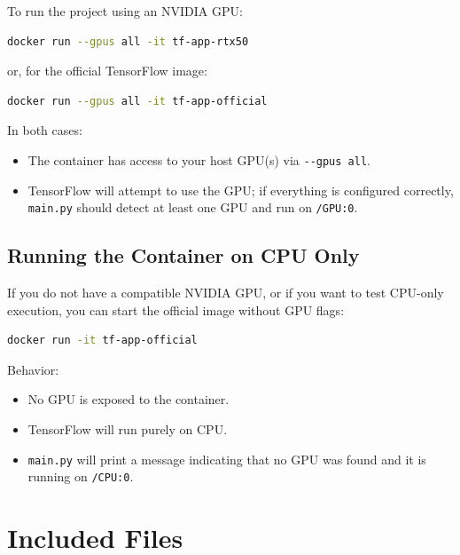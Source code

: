 \documentclass[a4paper,11pt]{article}
\begin{document}
To run the project using an NVIDIA GPU:


\begin{lstlisting}[language=bash]
docker run --gpus all -it tf-app-rtx50
\end{lstlisting}


or, for the official TensorFlow image:

\begin{lstlisting}[language=bash]
docker run --gpus all -it tf-app-official
\end{lstlisting}


In both cases:
\begin{itemize}
  \item The container has access to your host GPU(s) via \verb|--gpus all|.
  \item TensorFlow will attempt to use the GPU; if everything is configured
        correctly, \texttt{main.py} should detect at least one GPU and run on
        \verb|/GPU:0|.
\end{itemize}

\subsection{Running the Container on CPU Only}

If you do not have a compatible NVIDIA GPU, or if you want to test
CPU-only execution, you can start the official image without GPU flags:


\begin{lstlisting}[language=bash]
docker run -it tf-app-official
\end{lstlisting}

Behavior:
\begin{itemize}
  \item No GPU is exposed to the container.
  \item TensorFlow will run purely on CPU.
  \item \texttt{main.py} will print a message indicating that no GPU was found
        and it is running on \verb|/CPU:0|.
\end{itemize}



\hrulefill

\section{Included Files}
\end{document}
